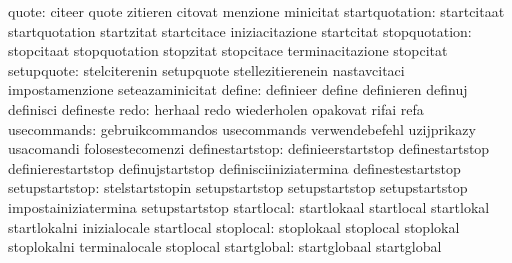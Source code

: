                            quote: citeer                           quote
                                  zitieren                         citovat
                                  menzione                         minicitat
                  startquotation: startcitaat                      startquotation
                                  startzitat                       startcitace
                                  iniziacitazione                  startcitat
                   stopquotation: stopcitaat                       stopquotation
                                  stopzitat                        stopcitace
                                  terminacitazione                 stopcitat
                      setupquote: stelciterenin                    setupquote
                                  stellezitierenein                nastavcitaci
                                  impostamenzione                  seteazaminicitat
                          define: definieer                        define
                                  definieren                       definuj
                                  definisci                        defineste
                            redo: herhaal                          redo
                                  wiederholen                      opakovat
                                  rifai                            refa
                     usecommands: gebruikcommandos                 usecommands
                                  verwendebefehl                   uzijprikazy
                                  usacomandi                       folosestecomenzi
                 definestartstop: definieerstartstop               definestartstop
                                  definierestartstop               definujstartstop
                                  definisciiniziatermina           definestestartstop
                  setupstartstop: stelstartstopin                  setupstartstop
                                  setupstartstop                   setupstartstop
                                  impostainiziatermina             setupstartstop
                      startlocal: startlokaal                      startlocal
                                  startlokal                       startlokalni
                                  inizialocale                     startlocal
                       stoplocal: stoplokaal                       stoplocal
                                  stoplokal                        stoplokalni
                                  terminalocale                    stoplocal
                     startglobal: startglobaal                     startglobal
